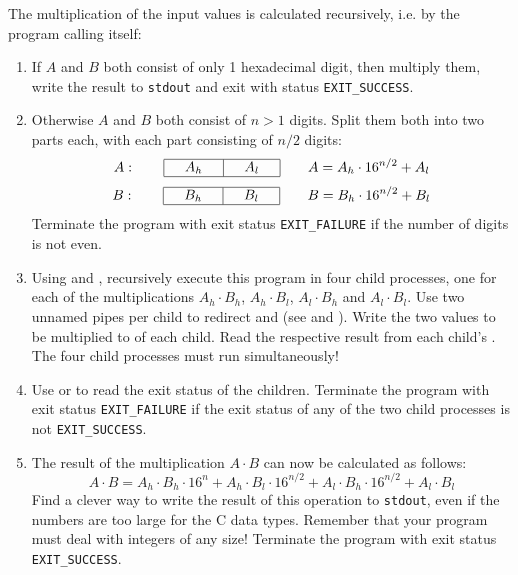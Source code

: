 The multiplication of the input values is calculated recursively,
i.e. by the program calling itself:
\begin{enumerate}
\item If $A$ and $B$ both consist of only 1 hexadecimal digit, then multiply them,
write the result to \texttt{stdout} and exit with status \verb|EXIT_SUCCESS|.
\item Otherwise $A$ and $B$ both consist of $n>1$ digits. Split them both into two parts each,
with each part consisting of $n/2$ digits:
\renewcommand{\arraystretch}{1.3}
\[
A:\quad\quad\begin{array}{|c|c|}\hline \quad A_h \quad & \quad A_l \quad \\\hline\end{array}\quad\quad A=A_h\cdot 16^{n/2}+A_l
\]
\[
B:\quad\quad\begin{array}{|c|c|}\hline \quad B_h \quad & \quad B_l \quad \\\hline\end{array}\quad\quad B=B_h\cdot 16^{n/2}+B_l
\]
Terminate the program with exit status \verb|EXIT_FAILURE|
if the number of digits is not even.

\item Using  and ,
recursively execute this program in four child processes,
one for each of the multiplications $A_h\cdot B_h$, $A_h\cdot B_l$, $A_l\cdot B_h$ and  $A_l\cdot B_l$.
Use two unnamed pipes per child
to redirect  and 
(see  and ).
Write the two values to be multiplied to  of each child.
Read the respective result from each child's .
The four child processes must run simultaneously!

\item Use  or 
to read the exit status of the children.
Terminate the program with exit status \verb|EXIT_FAILURE|
if the exit status of any of the two child processes is not \verb|EXIT_SUCCESS|.

\item The result of the multiplication $A\cdot B$ can now be calculated as follows:
\[
A\cdot B=A_h\cdot B_h\cdot 16^n + A_h\cdot B_l\cdot 16^{n/2} + A_l\cdot B_h\cdot 16^{n/2} + A_l\cdot B_l
\]
Find a clever way to write the result of this operation to \texttt{stdout},
even if the numbers are too large for the C data types.
Remember that your program must deal with integers of any size!
Terminate the program with exit status \verb|EXIT_SUCCESS|.

\end{enumerate}

